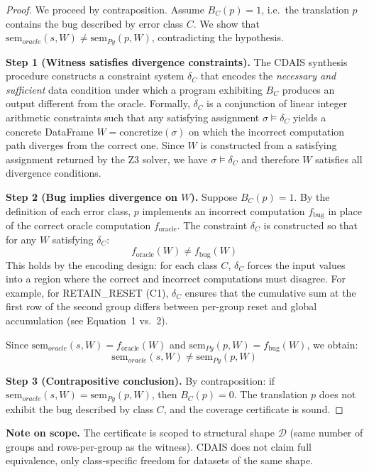 \documentclass[conference]{IEEEtran}
\begin{document}
\begin{proof}
We proceed by contraposition. Assume $B_C(p) = 1$, i.e.\ the translation $p$
contains the bug described by error class $C$. We show that
$\text{sem}_{oracle}(s, W) \neq \text{sem}_{Py}(p, W)$, contradicting the hypothesis.

\smallskip\noindent\textbf{Step 1 (Witness satisfies divergence constraints).}
The CDAIS synthesis procedure constructs a constraint system $\delta_C$ that
encodes the \emph{necessary and sufficient} data condition under which a
program exhibiting $B_C$ produces an output different from the oracle.
Formally, $\delta_C$ is a conjunction of linear integer arithmetic constraints
such that any satisfying assignment $\sigma \models \delta_C$ yields a
concrete DataFrame $W = \text{concretize}(\sigma)$ on which the incorrect
computation path diverges from the correct one. Since $W$ is constructed
from a satisfying assignment returned by the Z3 solver, we have
$\sigma \models \delta_C$ and therefore $W$ satisfies all divergence
conditions.

\smallskip\noindent\textbf{Step 2 (Bug implies divergence on $W$).}
Suppose $B_C(p) = 1$. By the definition of each error class, $p$ implements
an incorrect computation $f_{\text{bug}}$ in place of the correct oracle
computation $f_{\text{oracle}}$. The constraint $\delta_C$ is constructed
so that for any $W$ satisfying $\delta_C$:
\[
  f_{\text{oracle}}(W) \neq f_{\text{bug}}(W)
\]
This holds by the encoding design: for each class $C$, $\delta_C$ forces
the input values into a region where the correct and incorrect computations
must disagree. For example, for RETAIN\_RESET (C1), $\delta_C$ ensures
that the cumulative sum at the first row of the second group differs between
per-group reset and global accumulation (see Equation~1 vs.~2).

Since $\text{sem}_{oracle}(s, W) = f_{\text{oracle}}(W)$ and
$\text{sem}_{Py}(p, W) = f_{\text{bug}}(W)$, we obtain:
\[
  \text{sem}_{oracle}(s, W) \neq \text{sem}_{Py}(p, W)
\]

\smallskip\noindent\textbf{Step 3 (Contrapositive conclusion).}
By contraposition: if $\text{sem}_{oracle}(s, W) = \text{sem}_{Py}(p, W)$,
then $B_C(p) = 0$. The translation $p$ does not exhibit the bug described
by class $C$, and the coverage certificate is sound. \qedhere
\end{proof}

\textbf{Note on scope.} The certificate is scoped to structural shape $\mathcal{D}$
(same number of groups and rows-per-group as the witness). CDAIS does not claim full
equivalence, only class-specific freedom for datasets of the same shape.
\end{document}
